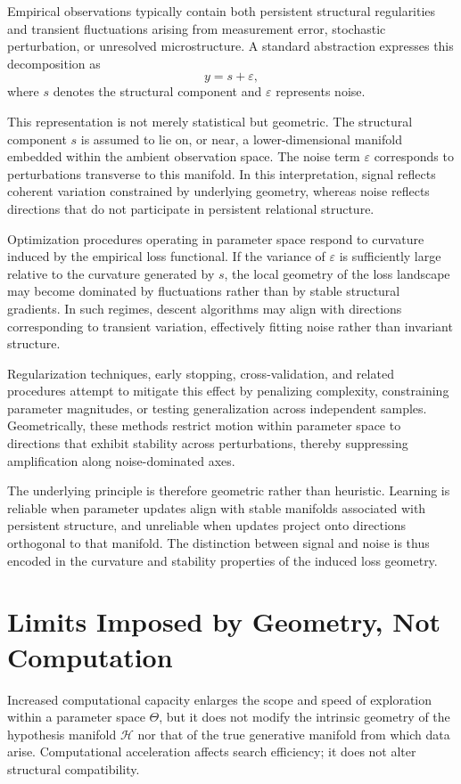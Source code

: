 \documentclass[12pt]{book}
\begin{document}
Empirical observations typically contain both persistent structural regularities and transient fluctuations arising from measurement error, stochastic perturbation, or unresolved microstructure. A standard abstraction expresses this decomposition as
\[
y = s + \varepsilon,
\]
where $s$ denotes the structural component and $\varepsilon$ represents noise.

This representation is not merely statistical but geometric. The structural component $s$ is assumed to lie on, or near, a lower-dimensional manifold embedded within the ambient observation space. The noise term $\varepsilon$ corresponds to perturbations transverse to this manifold. In this interpretation, signal reflects coherent variation constrained by underlying geometry, whereas noise reflects directions that do not participate in persistent relational structure.

Optimization procedures operating in parameter space respond to curvature induced by the empirical loss functional. If the variance of $\varepsilon$ is sufficiently large relative to the curvature generated by $s$, the local geometry of the loss landscape may become dominated by fluctuations rather than by stable structural gradients. In such regimes, descent algorithms may align with directions corresponding to transient variation, effectively fitting noise rather than invariant structure.

Regularization techniques, early stopping, cross-validation, and related procedures attempt to mitigate this effect by penalizing complexity, constraining parameter magnitudes, or testing generalization across independent samples. Geometrically, these methods restrict motion within parameter space to directions that exhibit stability across perturbations, thereby suppressing amplification along noise-dominated axes.

The underlying principle is therefore geometric rather than heuristic. Learning is reliable when parameter updates align with stable manifolds associated with persistent structure, and unreliable when updates project onto directions orthogonal to that manifold. The distinction between signal and noise is thus encoded in the curvature and stability properties of the induced loss geometry.

\section{Limits Imposed by Geometry, Not Computation}

Increased computational capacity enlarges the scope and speed of exploration within a parameter space $\Theta$, but it does not modify the intrinsic geometry of the hypothesis manifold $\mathcal{H}$ nor that of the true generative manifold from which data arise. Computational acceleration affects search efficiency; it does not alter structural compatibility.
\end{document}
